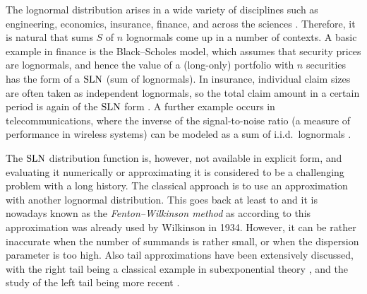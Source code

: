 The lognormal distribution arises in a wide variety of disciplines such
as engineering, economics, insurance, finance, and
across the sciences \cite{aitchison1957lognormal,crow1988lognormal,
johnson1994continuous,limpert2001log,dufresne2008}.
Therefore, it is natural that sums $S$ of $n$ lognormals come up in a
number of contexts. A basic example in finance is the
Black--Scholes
model, which assumes that security prices are %
lognormals, and hence the value of a
(long-only) portfolio with $n$ securities has the form of a $\mathrm{SLN}$ (sum of lognormals).
In  insurance, individual claim sizes are often taken as independent
lognormals, so the total claim amount in a certain period is
again of the $\mathrm{SLN}$ form \cite{ThorinWikstad1977}.
A further example occurs
in telecommunications, where
the inverse of the signal-to-noise ratio (a measure of performance in
wireless systems)
can be modeled as a sum of i.i.d.\ lognormals \citep{Gubner2006}.

The $\mathrm{SLN}$ distribution function is, however, not available
in explicit form,
and evaluating it numerically or approximating it is considered to be a challenging problem
with a long history.
The classical approach is to use an approximation
with another lognormal distribution.  This goes back at least to
\cite{fenton1960sum} and it is nowadays
known as the \emph{Fenton--Wilkinson method} as
according to \cite{Marlow1967} this approximation was already
used by Wilkinson in 1934.
However, it can be rather inaccurate when the number of summands is rather small, or
when the dispersion
parameter is too high.
Also tail approximations have been extensively discussed, with the
right tail being a classical example in subexponential theory \cite{embrechts2013modelling}, and the
study of the left tail being more recent \cite{asmussen2015exponential,tankov2015tail}.

